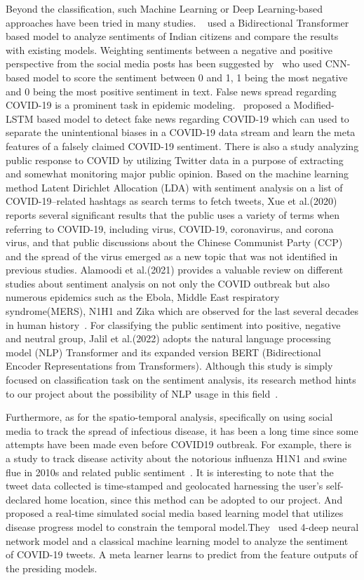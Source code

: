 Beyond the classification, such Machine Learning or Deep Learning-based
approaches have been tried in many studies. ~\cite
{chintalapudi2021sentimental} used a Bidirectional Transformer based model to
analyze sentiments of Indian citizens and compare the results with existing
models. Weighting sentiments between a negative and positive perspective from
the social media posts has been suggested by~\cite{alshalan2020detection} who
used CNN-based model to score the sentiment between 0 and 1, 1 being the most
negative and 0 being the most positive sentiment in text. False news spread
regarding COVID-19 is a prominent task in epidemic modeling.~\cite
{abdelminaam2021coaid} proposed a Modified-LSTM based model to detect fake
news regarding COVID-19 which can used to separate the unintentional biases
in a COVID-19 data stream and learn the meta features of a falsely claimed
COVID-19 sentiment. There is also a study analyzing public response to COVID
by utilizing Twitter data in a purpose of extracting and somewhat monitoring
major public opinion. Based on the machine learning method Latent Dirichlet
Allocation (LDA) with sentiment analysis on a list of COVID-19–related
hashtags as search terms to fetch tweets, Xue et al.(2020) reports several
significant results that the public uses a variety of terms when referring to
COVID-19, including virus, COVID-19, coronavirus, and corona virus, and that
public discussions about the Chinese Communist Party (CCP) and the spread of
the virus emerged as a new topic that was not identified in previous studies.
Alamoodi et al.(2021) provides a valuable review on different studies about
sentiment analysis on not only the COVID outbreak but also numerous epidemics
such as the Ebola, Middle East respiratory syndrome(MERS), N1H1 and Zika
which are observed for the last several decades in human history~\cite
{alamoodi2021sentiment}. For classifying the public sentiment into positive,
negative and neutral group, Jalil et al.(2022) adopts the natural language
processing model (NLP) Transformer and its expanded version BERT
(Bidirectional Encoder Representations from Transformers). Although this
study is simply focused on classification task on the sentiment analysis, its
research method hints to our project about the possibility of NLP usage in
this field~\cite{jalil2021covid}.

Furthermore, as for the spatio-temporal analysis, specifically on using social
media to track the spread of infectious disease, it has been a long time
since some attempts have been made even before COVID19 outbreak. For example,
there is a study to track disease activity about the notorious influenza H1N1
and swine flue in 2010s and related public sentiment~\cite
{signorini2011use}. It is interesting to note that the tweet data collected
is time-stamped and geolocated harnessing the user’s self-declared home
location, since this method can be adopted to our project. And~\cite
{signorini2011use} proposed a real-time simulated social media based learning
model that utilizes disease progress model to constrain the temporal
model.They~\cite{basiri2021novel} used 4-deep neural network model and a
classical machine learning model to analyze the sentiment of COVID-19 tweets.
A meta learner learns to predict from the feature outputs of the presiding
models.

